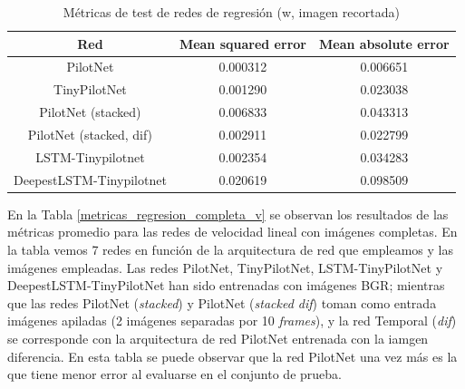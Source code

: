 \begin{table}[H]
\centering
\caption{Métricas de test de redes de regresión (w, imagen recortada)}
\label{metricas_regresion_recortada_w}
\begin{tabular}{c|c|c|}
\cline{1-3}
                        \multicolumn{1}{|c|}{Red}    & Mean squared error       & Mean absolute error             \\ \hline
\multicolumn{1}{|c|}{PilotNet}    & 0.000312   &  0.006651   \\ \hline
\multicolumn{1}{|c|}{TinyPilotNet}     & 0.001290      & 0.023038   \\ \hline
\multicolumn{1}{|c|}{PilotNet (stacked)}   & 0.006833    & 0.043313  \\ \hline
\multicolumn{1}{|c|}{PilotNet (stacked, dif)}     & 0.002911    & 0.022799        \\ \hline
\multicolumn{1}{|c|}{LSTM-Tinypilotnet}     & 0.002354    & 0.034283        \\ \hline
\multicolumn{1}{|c|}{DeepestLSTM-Tinypilotnet}     & 0.020619   & 0.098509        \\ \hline
\end{tabular}
\end{table}

En la Tabla \ref{metricas_regresion_completa_v} se observan los resultados de las métricas promedio para las redes de velocidad lineal con imágenes completas. En la tabla vemos 7 redes en función de la arquitectura de red que empleamos y las imágenes empleadas. Las redes PilotNet, TinyPilotNet, LSTM-TinyPilotNet y DeepestLSTM-TinyPilotNet han sido entrenadas con imágenes BGR; mientras que las redes PilotNet (\textit{stacked}) y PilotNet (\textit{stacked dif}) toman como entrada imágenes apiladas (2 imágenes separadas por 10 \textit{frames}), y la red Temporal (\textit{dif}) se corresponde con la arquitectura de red PilotNet entrenada con la iamgen diferencia. En esta tabla se puede observar que la red PilotNet una vez más es la que tiene menor error al evaluarse en el conjunto de prueba.\\


